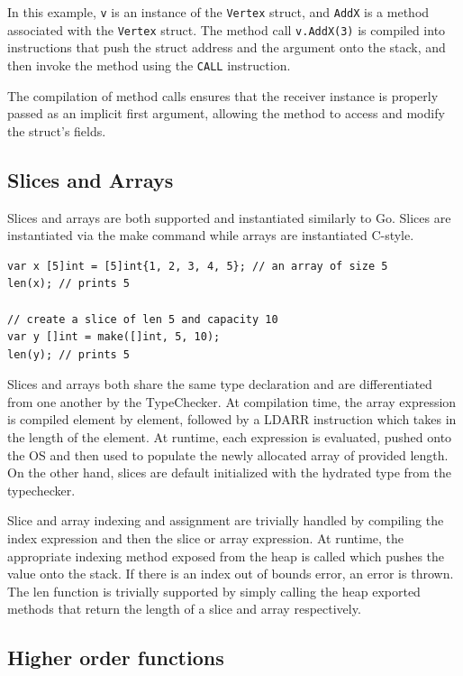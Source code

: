 \documentclass{report}
\begin{document}
In this example, \texttt{v} is an instance of the \texttt{Vertex} struct, and \texttt{AddX} is a method associated with the \texttt{Vertex} struct. The method call \texttt{v.AddX(3)} is compiled into instructions that push the struct address and the argument onto the stack, and then invoke the method using the \texttt{CALL} instruction.

The compilation of method calls ensures that the receiver instance is properly passed as an implicit first argument, allowing the method to access and modify the struct's fields.

\subsection{Slices and Arrays}

Slices and arrays are both supported and instantiated similarly to Go. Slices are instantiated via the make command while arrays are instantiated C-style.

\begin{verbatim}
var x [5]int = [5]int{1, 2, 3, 4, 5}; // an array of size 5
len(x); // prints 5

// create a slice of len 5 and capacity 10
var y []int = make([]int, 5, 10); 
len(y); // prints 5
\end{verbatim}

Slices and arrays both share the same type declaration and are differentiated from one another by the TypeChecker. At compilation time, the array expression is compiled element by element, followed by a LDARR instruction which takes in the length of the element. At runtime, each expression is evaluated, pushed onto the OS and then used to populate the newly allocated array of provided length. On the other hand, slices are default initialized with the hydrated type from the typechecker.

Slice and array indexing and assignment are trivially handled by compiling the index expression and then the slice or array expression. At runtime, the appropriate indexing method exposed from the heap is called which pushes the value onto the stack. If there is an index out of bounds error, an error is thrown. The len function is trivially supported by simply calling the heap exported methods that return the length of a slice and array respectively.

\subsection{Higher order functions}
\end{document}
